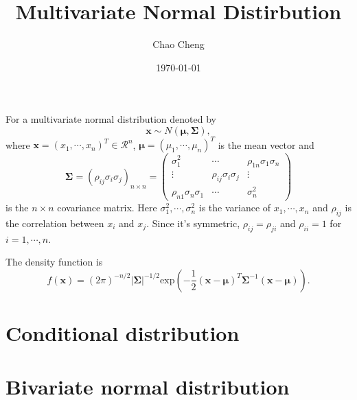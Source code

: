 \documentclass[a4paper,12pt]{article}
\title{Multivariate Normal Distirbution}
\author{Chao Cheng}
\date{\today}
\begin{document}
\maketitle

For a multivariate normal distribution denoted by
\[
  \bm{x} \sim
  N\left(
    \bm{\mu}, \bm{\Sigma}
  \right)
  ,
\]
where $\bm{x} = \left(x_1, \cdots, x_n\right)^T\in\mathcal{R}^n$, $\bm{\mu} = \left(\mu_1, \cdots, \mu_n\right)^T$ is the mean vector and
\[
  \bm{\Sigma} = \left(
    \rho_{ij}\sigma_i\sigma_j
  \right)_{n\times n}
  =
  \begin{pmatrix}
    \sigma_1^2 & \cdots & \rho_{1n}\sigma_1\sigma_n    \\
    \vdots & \rho_{ij}\sigma_i\sigma_j & \vdots    \\
    \rho_{n1}\sigma_n\sigma_1 & \cdots & \sigma_n^2
  \end{pmatrix}
\]
is the $n\times n$ covariance matrix. Here $\sigma_1^2, \cdots, \sigma_n^2$ is the variance of $x_1, \cdots, x_n$ and $\rho_{ij}$ is the correlation between $x_i$ and $x_j$. Since it's symmetric, $\rho_{ij} = \rho_{ji}$ and $\rho_{ii} = 1$ for $i = 1, \cdots, n$.
\par
The density function is
\[
  f\left(\bm{x}\right) =
  \left(2\pi\right)^{-n / 2}
  \left|\bm{\Sigma}\right|^{-1 / 2}
  \mathrm{exp}\left(
    -\frac{1}{2}
    \left(\bm{x} - \bm{\mu}\right)^T
    \bm{\Sigma}^{-1}
    \left(\bm{x} - \bm{\mu}\right)
  \right)
  .
\]

\section{Conditional distribution}
\label{sec:cond-distr}



\section{Bivariate normal distribution}
\label{sec:bivar-norm-distr}
\end{document}
